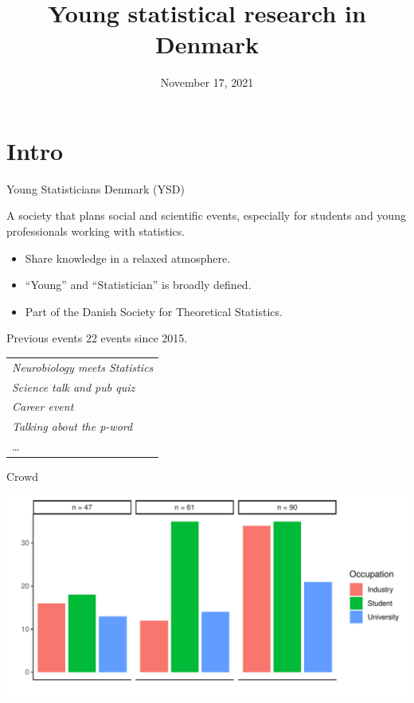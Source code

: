 \documentclass[14pt]{beamer}\usepackage{listings}
\date{November 17, 2021}
\title{Young statistical research in Denmark}
\begin{document}
\maketitle
{}

\section{Intro}
\label{sec:org03ba68e}
\begin{frame}[label={sec:org13d5759}]{Young Statisticians Denmark (YSD)}
\small

A society that plans social and scientific events, especially for students and young
professionals working with statistics.
\vfill

\begin{itemize}
\item Share knowledge in a relaxed atmosphere.
\item ``Young'' and ``Statistician'' is broadly defined.
\item Part of the Danish Society for Theoretical Statistics.
\end{itemize}

\vfill     
\end{frame}

\begin{frame}[label={sec:orgf8a4dd2}]{Previous events}
22 events since 2015.

\vfill

\begin{center}
\begin{tabular}{l}
\emph{Neurobiology meets Statistics}\\
\emph{Science talk and pub quiz}\\
\emph{Career event}\\
\emph{Talking about the p-word}\\
\ldots{}\\
\end{tabular}

\end{center}
\end{frame}

\begin{frame}[label={sec:orgfe98e3b}]{Crowd}
\begin{center}
\includegraphics[width=.9\linewidth]{./crowd-plot.pdf}
\end{center}
\end{frame}
\end{document}
